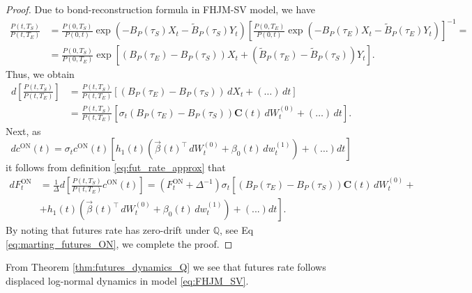 \documentclass[pdftex,11pt,a4paper] {article}
\begin{document}
\begin{proof}
Due to bond-reconstruction formula in FHJM-SV model, we have
\begin{equation*}
\begin{split}
\frac{P(t,T_S)}{P(t,T_E)}&=\frac{P(0,T_S)}{P(0,t)}\exp\left(-B_P(\tau_S)X_t-\tilde B_P(\tau_S)Y_t\right) \left[ \frac{P(0,T_E)}{P(0,t)}\exp\left(-B_P(\tau_E)X_t-\tilde B_P(\tau_E)Y_t\right)\right]^{-1}=\\
&=\frac{P(0,T_S)}{P(0,T_E)}\exp\left[(B_P(\tau_E)-B_P(\tau_S))X_t+(\tilde B_P(\tau_E)-\tilde B_P(\tau_S))Y_t\right].
\end{split}
\end{equation*}
Thus, we obtain
\begin{equation*}
\begin{split}
d\left[\frac{P(t,T_S)}{P(t,T_E)}\right]&=\frac{P(t,T_S)}{P(t,T_E)}\left[(B_P(\tau_E)-B_P(\tau_S))\,dX_t+(\ldots)\,dt\right]\\
&=\frac{P(t,T_S)}{P(t,T_E)}\left[\sigma_t(B_P(\tau_E)-B_P(\tau_S))\mathbf{C}(t)\,dW^{(0)}_t+(\ldots)\,dt\right].
\end{split}
\end{equation*}
Next, as 
\begin{equation*}
d c^{\mathrm{ON}}(t)=\sigma_t  c^{\mathrm{ON}}(t)\left[h_1(t)\left(\vec{\beta}(t)^\top\,dW_t^{(0)}+\beta_0(t)\,dw_t^{(1)}\right)+(\ldots)dt\right]
\end{equation*}
it follows from definition \eqref{eq:fut_rate_approx} that
\begin{equation*}
\begin{split}
d F^{\mathrm{ON}}_t&=\frac{1}{\Delta}d\left[\frac{P(t,T_S)}{P(t,T_E)}c^{\mathrm{ON}}(t)\right]=\left( F^{\mathrm{ON}}_t+\Delta^{-1}\right)\sigma_t\left[(B_P(\tau_E)-B_P(\tau_S))\mathbf{C}(t)\,dW_t^{(0)}+\right.\\
&\left.+h_1(t)\left(\vec{\beta}(t)^\top\,dW_t^{(0)}+\beta_0(t)\,dw_t^{(1)}\right)+(...)dt\right].
\end{split}
\end{equation*}
By noting that futures rate has zero-drift under $\mathbb{Q}$, see Eq \eqref{eq:marting_futures_ON}, we complete the proof. 
\end{proof}


 From Theorem \ref{thm:futures_dynamics_Q} we see that futures rate follows displaced log-normal dynamics in model \eqref{eq:FHJM_SV}. 
\end{document}
